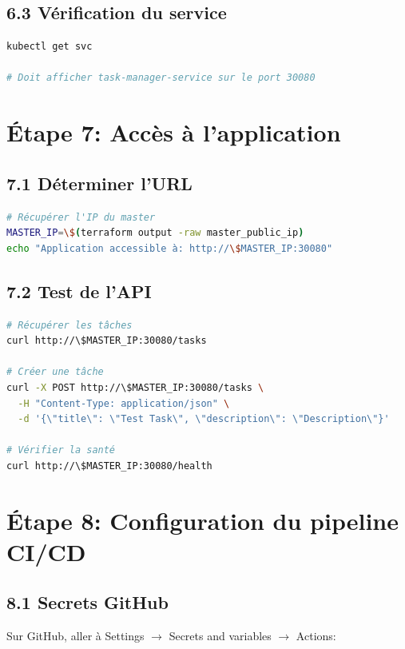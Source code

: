 \documentclass[12pt,a4paper,twoside]{report}
\begin{document}
\subsection{6.3 Vérification du service}

\begin{lstlisting}[language=bash]
kubectl get svc

# Doit afficher task-manager-service sur le port 30080
\end{lstlisting}

\section{Étape 7: Accès à l'application}

\subsection{7.1 Déterminer l'URL}

\begin{lstlisting}[language=bash]
# Récupérer l'IP du master
MASTER_IP=\$(terraform output -raw master_public_ip)
echo "Application accessible à: http://\$MASTER_IP:30080"
\end{lstlisting}

\subsection{7.2 Test de l'API}

\begin{lstlisting}[language=bash]
# Récupérer les tâches
curl http://\$MASTER_IP:30080/tasks

# Créer une tâche
curl -X POST http://\$MASTER_IP:30080/tasks \
  -H "Content-Type: application/json" \
  -d '{\"title\": \"Test Task\", \"description\": \"Description\"}'

# Vérifier la santé
curl http://\$MASTER_IP:30080/health
\end{lstlisting}

\section{Étape 8: Configuration du pipeline CI/CD}

\subsection{8.1 Secrets GitHub}

Sur GitHub, aller à Settings $\rightarrow$ Secrets and variables $\rightarrow$ Actions:
\end{document}
